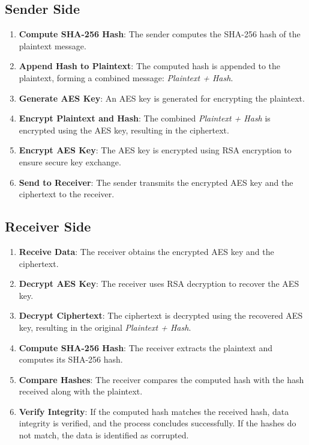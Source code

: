 \documentclass{article}
\begin{document}
\subsection*{Sender Side}

\begin{enumerate}
    \item \textbf{Compute SHA-256 Hash}: 
    The sender computes the SHA-256 hash of the plaintext message.

    \item \textbf{Append Hash to Plaintext}:
    The computed hash is appended to the plaintext, forming a combined message: \textit{Plaintext + Hash}.

    \item \textbf{Generate AES Key}:
    An AES key is generated for encrypting the plaintext.

    \item \textbf{Encrypt Plaintext and Hash}:
    The combined \textit{Plaintext + Hash} is encrypted using the AES key, resulting in the ciphertext.

    \item \textbf{Encrypt AES Key}:
    The AES key is encrypted using RSA encryption to ensure secure key exchange.

    \item \textbf{Send to Receiver}:
    The sender transmits the encrypted AES key and the ciphertext to the receiver.
\end{enumerate}

\subsection*{Receiver Side}

\begin{enumerate}
    \item \textbf{Receive Data}:
    The receiver obtains the encrypted AES key and the ciphertext.

    \item \textbf{Decrypt AES Key}:
    The receiver uses RSA decryption to recover the AES key.

    \item \textbf{Decrypt Ciphertext}:
    The ciphertext is decrypted using the recovered AES key, resulting in the original \textit{Plaintext + Hash}.

    \item \textbf{Compute SHA-256 Hash}:
    The receiver extracts the plaintext and computes its SHA-256 hash.

    \item \textbf{Compare Hashes}:
    The receiver compares the computed hash with the hash received along with the plaintext.

    \item \textbf{Verify Integrity}:
    If the computed hash matches the received hash, data integrity is verified, and the process concludes successfully.
    If the hashes do not match, the data is identified as corrupted.
\end{enumerate}
\end{document}
